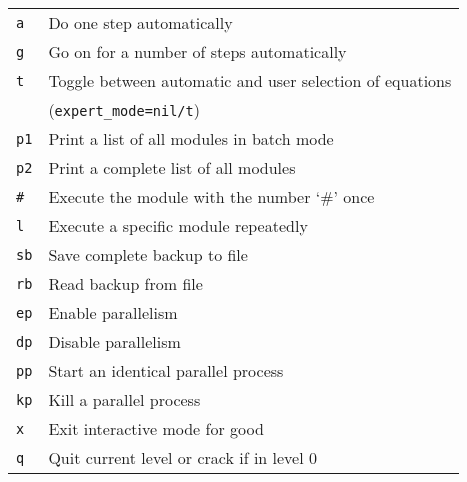 
\begin{longtable}[l]{ll}
  \texttt{a}  & Do one step automatically \\
  \texttt{g}  & Go on for a number of steps automatically \\
  \texttt{t}  & Toggle between automatic and user selection of equations \\
  & (\texttt{expert\_mode=nil/t}) \\
  \texttt{p1} & Print a list of all modules in batch mode \\
  \texttt{p2} & Print a complete list of all modules \\
  \texttt{\#} & Execute the module with the number `\#' once \\
  \texttt{l}  & Execute a specific module repeatedly \\
  \texttt{sb} & Save complete backup to file \\
  \texttt{rb} & Read backup from file \\
  \texttt{ep} & Enable parallelism \\
  \texttt{dp} & Disable parallelism \\
  \texttt{pp} & Start an identical parallel process \\
  \texttt{kp} & Kill a parallel process \\
  \texttt{x}  & Exit interactive mode for good \\
  \texttt{q}  & Quit current level or crack if in level 0
\end{longtable}


